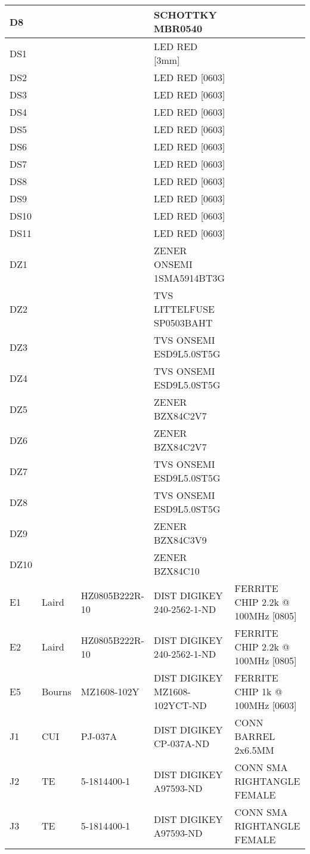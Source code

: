 \begin{longtable}{|l|l|l|l|l|}
\hline
D8 &  &  & SCHOTTKY MBR0540 &  \\
\hline
DS1 &  &  & LED RED [3mm] &  \\
\hline
DS2 &  &  & LED RED [0603] &  \\
\hline
DS3 &  &  & LED RED [0603] &  \\
\hline
DS4 &  &  & LED RED [0603] &  \\
\hline
DS5 &  &  & LED RED [0603] &  \\
\hline
DS6 &  &  & LED RED [0603] &  \\
\hline
DS7 &  &  & LED RED [0603] &  \\
\hline
DS8 &  &  & LED RED [0603] &  \\
\hline
DS9 &  &  & LED RED [0603] &  \\
\hline
DS10 &  &  & LED RED [0603] &  \\
\hline
DS11 &  &  & LED RED [0603] &  \\
\hline
DZ1 &  &  & ZENER ONSEMI 1SMA5914BT3G &  \\
\hline
DZ2 &  &  & TVS LITTELFUSE SP0503BAHT &  \\
\hline
DZ3 &  &  & TVS ONSEMI ESD9L5.0ST5G &  \\
\hline
DZ4 &  &  & TVS ONSEMI ESD9L5.0ST5G &  \\
\hline
DZ5 &  &  & ZENER BZX84C2V7 &  \\
\hline
DZ6 &  &  & ZENER BZX84C2V7 &  \\
\hline
DZ7 &  &  & TVS ONSEMI ESD9L5.0ST5G &  \\
\hline
DZ8 &  &  & TVS ONSEMI ESD9L5.0ST5G &  \\
\hline
DZ9 &  &  & ZENER BZX84C3V9 &  \\
\hline
DZ10 &  &  & ZENER BZX84C10 &  \\
\hline
E1 & Laird & HZ0805B222R-10 & DIST DIGIKEY 240-2562-1-ND & FERRITE CHIP 2.2k @ 100MHz [0805] \\
\hline
E2 & Laird & HZ0805B222R-10 & DIST DIGIKEY 240-2562-1-ND & FERRITE CHIP 2.2k @ 100MHz [0805] \\
\hline
E5 & Bourns & MZ1608-102Y & DIST DIGIKEY MZ1608-102YCT-ND & FERRITE CHIP 1k @ 100MHz [0603] \\
\hline
J1 & CUI & PJ-037A & DIST DIGIKEY CP-037A-ND & CONN BARREL 2x6.5MM \\
\hline
J2 & TE & 5-1814400-1 & DIST DIGIKEY A97593-ND & CONN SMA RIGHTANGLE FEMALE \\
\hline
J3 & TE & 5-1814400-1 & DIST DIGIKEY A97593-ND & CONN SMA RIGHTANGLE FEMALE \\

\end{longtable}
